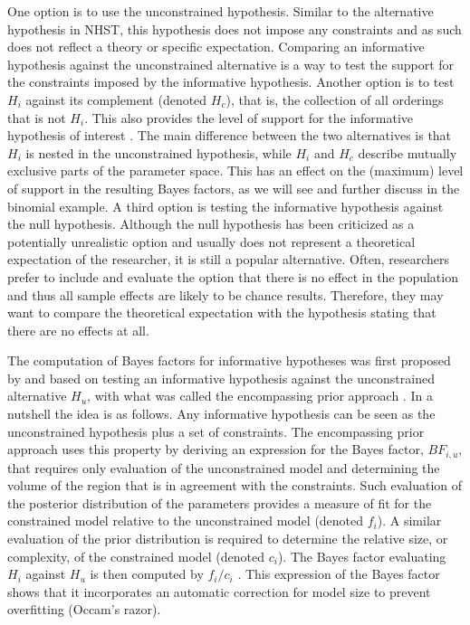 \documentclass[11pt,reqno]{article}
\begin{document}
One option is to use the unconstrained hypothesis. Similar to the alternative hypothesis in NHST, this hypothesis does not impose any constraints and as such does not reflect a theory or specific expectation. Comparing an informative hypothesis against the unconstrained alternative is a way to test the support for the constraints imposed by the informative hypothesis. Another option is to test $H_i$ against its complement (denoted $H_c$), that is, the collection of all orderings that is not $H_i$. This also provides the level of support for the informative hypothesis of interest \citep[see][]{hoijtink_informative_2012, vandeun_testing_2009, vanrossum_hypothesis_2013}. The main difference between the two alternatives is that $H_i$ is nested in the unconstrained hypothesis, while $H_i$ and $H_c$ describe mutually exclusive parts of the parameter space. This has an effect on the (maximum) level of support in the resulting Bayes factors, as we will see and further discuss in the binomial example. A third option is testing the informative hypothesis against the null hypothesis. Although the null hypothesis has been criticized as a potentially unrealistic option \citep[e.g.,][]{cohen_earth_1994, krueger_null_2001, lykken_wrong_1991} and usually does not represent a theoretical expectation of the researcher, it is still a popular alternative. Often, researchers prefer to include and evaluate the option that there is no effect in the population and thus all sample effects are likely to be chance results. Therefore, they may want to compare the theoretical expectation with the hypothesis stating that there are no effects at all.


The computation of Bayes factors for informative hypotheses was first proposed by \citet{klugkist_inequality_2005} and based on testing an informative hypothesis against the unconstrained alternative $H_u$, with what was called the encompassing prior approach \citep[see also][]{hoijtink_klugkist_boelen_2008, hoijtink_informative_2012}. In a nutshell the idea is as follows. Any informative hypothesis can be seen as the unconstrained hypothesis plus a set of constraints. The encompassing prior approach uses this property by deriving an expression for the Bayes factor, $BF_{i,u}$, that requires only evaluation of the unconstrained model and determining the volume of the region that is in agreement with the constraints. Such evaluation of the posterior distribution of the parameters provides a measure of fit for the constrained model relative to the unconstrained model (denoted $f_i$). A similar evaluation of the prior distribution is required to determine the relative size, or complexity, of the constrained model (denoted $c_i$). The Bayes factor evaluating $H_i$ against $H_u$ is then computed by $f_i/c_i$  \citep[for a more technical description of the encompassing prior approach, see for instance,][]{klugkist_inequality_2005, mulder_equality_2010}.
This expression of the Bayes factor shows that it incorporates an automatic correction for model size to prevent overfitting (Occam's razor).
\end{document}
